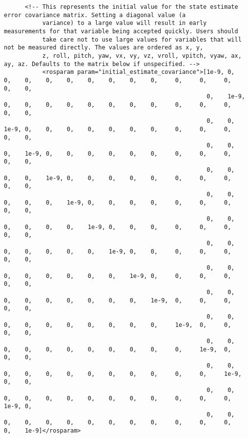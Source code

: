 \begin{verbatim}
      <!-- This represents the initial value for the state estimate error covariance matrix. Setting a diagonal value (a
           variance) to a large value will result in early measurements for that variable being accepted quickly. Users should
           take care not to use large values for variables that will not be measured directly. The values are ordered as x, y,
           z, roll, pitch, yaw, vx, vy, vz, vroll, vpitch, vyaw, ax, ay, az. Defaults to the matrix below if unspecified. -->
           <rosparam param="initial_estimate_covariance">[1e-9, 0,    0,    0,    0,    0,    0,    0,    0,    0,     0,     0,     0,    0,    0,
                                                          0,    1e-9, 0,    0,    0,    0,    0,    0,    0,    0,     0,     0,     0,    0,    0,
                                                          0,    0,    1e-9, 0,    0,    0,    0,    0,    0,    0,     0,     0,     0,    0,    0,
                                                          0,    0,    0,    1e-9, 0,    0,    0,    0,    0,    0,     0,     0,     0,    0,    0,
                                                          0,    0,    0,    0,    1e-9, 0,    0,    0,    0,    0,     0,     0,     0,    0,    0,
                                                          0,    0,    0,    0,    0,    1e-9, 0,    0,    0,    0,     0,     0,     0,    0,    0,
                                                          0,    0,    0,    0,    0,    0,    1e-9, 0,    0,    0,     0,     0,     0,    0,    0,
                                                          0,    0,    0,    0,    0,    0,    0,    1e-9, 0,    0,     0,     0,     0,    0,    0,
                                                          0,    0,    0,    0,    0,    0,    0,    0,    1e-9, 0,     0,     0,     0,    0,    0,
                                                          0,    0,    0,    0,    0,    0,    0,    0,    0,    1e-9,  0,     0,     0,    0,    0,
                                                          0,    0,    0,    0,    0,    0,    0,    0,    0,    0,     1e-9,  0,     0,    0,    0,
                                                          0,    0,    0,    0,    0,    0,    0,    0,    0,    0,     0,     1e-9,  0,    0,    0,
                                                          0,    0,    0,    0,    0,    0,    0,    0,    0,    0,     0,     0,     1e-9, 0,    0,
                                                          0,    0,    0,    0,    0,    0,    0,    0,    0,    0,     0,     0,     0,    1e-9, 0,
                                                          0,    0,    0,    0,    0,    0,    0,    0,    0,    0,     0,     0,     0,    0,    1e-9]</rosparam>



\end{verbatim}
